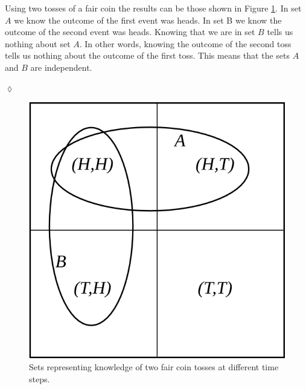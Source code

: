 \begin{example}
Using two tosses of a fair coin the results can be those shown in Figure \ref{fig:03coinProb}. In set $A$ we know the outcome of the first event was heads. In set B we know the outcome of the second event was heads. Knowing that we are in set $B$ tells us nothing about set $A$. In other words, knowing the outcome of the second toss tells us nothing about the outcome of the first toss. This means that the sets $A$ and $B$ are independent.
\end{example}
$\lozenge$
\begin{figure}[ht!]
	\centering
	\includegraphics[width=.3\textwidth]{images/03coinProb}
	\caption{Sets representing knowledge of two fair coin tosses at different time steps.}
	\label{fig:03coinProb}
\end{figure}

